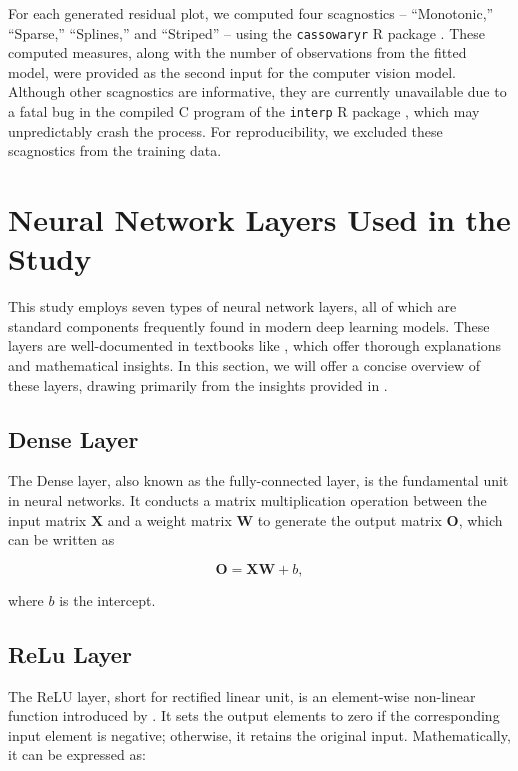 \documentclass[]{interact}
\theoremstyle{plain}%
\theoremstyle{definition}
\theoremstyle{remark}
\begin{document}
For each generated residual plot, we computed four scagnostics --
``Monotonic,'' ``Sparse,'' ``Splines,'' and ``Striped'' -- using the
\texttt{cassowaryr} R package \citep{mason2022cassowaryr}. These
computed measures, along with the number of observations from the fitted
model, were provided as the second input for the computer vision model.
Although other scagnostics are informative, they are currently
unavailable due to a fatal bug in the compiled C program of the
\texttt{interp} R package \citep{Albrecht2023interp}, which may
unpredictably crash the process. For reproducibility, we excluded these
scagnostics from the training data.

\section{Neural Network Layers Used in the
Study}\label{neural-network-layers-used-in-the-study}

This study employs seven types of neural network layers, all of which
are standard components frequently found in modern deep learning models.
These layers are well-documented in textbooks like
\citet{goodfellow2016deep}, which offer thorough explanations and
mathematical insights. In this section, we will offer a concise overview
of these layers, drawing primarily from the insights provided in
\citet{goodfellow2016deep}.

\subsection{Dense Layer}\label{dense-layer}

The Dense layer, also known as the fully-connected layer, is the
fundamental unit in neural networks. It conducts a matrix multiplication
operation between the input matrix \(\boldsymbol{X}\) and a weight
matrix \(\boldsymbol{W}\) to generate the output matrix
\(\boldsymbol{O}\), which can be written as

\[\boldsymbol{O} = \boldsymbol{X}\boldsymbol{W} + b,\]

where \(b\) is the intercept.

\subsection{ReLu Layer}\label{relu-layer}

The ReLU layer, short for rectified linear unit, is an element-wise
non-linear function introduced by \citet{nair2010rectified}. It sets the
output elements to zero if the corresponding input element is negative;
otherwise, it retains the original input. Mathematically, it can be
expressed as:
\end{document}
